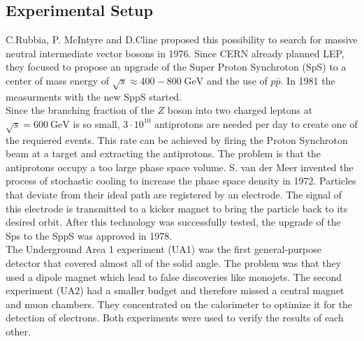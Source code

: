 \subsection{Experimental Setup}
C.Rubbia, P. McIntyre and D.Cline proposed this possibility to search for massive neutral intermediate vector bosons in 1976. Since CERN already planned LEP, they focused to propose an upgrade of the Super Proton Synchroton (SpS) to a center of mass energy of $\sqrt{s} \approx 400-800 \;\si{\GeV}$ and the use of $p\bar{p}$. In 1981 the measurments with the new SppS started.\\
Since the branching fraction of the $Z$ boson into two charged leptons at $\sqrt{s}=\SI{600}{\giga\electronvolt}$ is so small, $3\cdot10^{10}$ antiprotons are needed per day to create one of the requiered events. This rate can be achieved by firing the Proton Synchroton beam at a target and extracting the antiprotons. The problem is that the antiprotons occupy a too large phase space volume. S. van der Meer invented the process of stochastic cooling to increase the phase space density in 1972. Particles that deviate from their ideal path are registered by an electrode. The signal of this electrode is transmitted to a kicker magnet to bring the particle back to its desired orbit. After this technology was successfully tested, the upgrade of the Sps to the SppS was approved in 1978.\\
The Underground Area 1 experiment (UA1) was the first general-purpose detector that covered almost all of the solid angle. The problem was that they used a dipole magnet which lead to false discoveries like monojets. The second experiment (UA2) had a smaller budget and therefore missed a central magnet and muon chambers. They concentrated on the calorimeter to optimize it for the detection of electrons. Both experiments were used to verify the results of each other.

